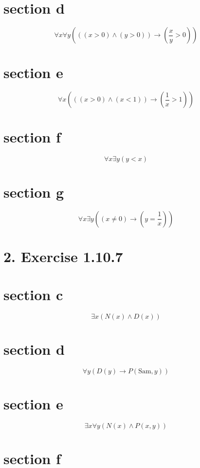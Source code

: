 \documentclass[10pt]{article}
\begin{document}
\section*{section d}

$$
\forall x \forall y\left(((x>0) \wedge(y>0)) \rightarrow\left(\frac{x}{y}>0\right)\right)
$$

\section*{section e}

$$
\forall x\left(((x>0) \wedge(x<1)) \rightarrow\left(\frac{1}{x}>1\right)\right)
$$

\section*{section f}

$$
\forall x \exists y(y<x)
$$

\section*{section g}

$$
\forall x \exists y\left((x \neq 0) \rightarrow\left(y=\frac{1}{x}\right)\right)
$$

\section*{2. Exercise 1.10.7}
\section*{section c}
$$
\exists x(N(x) \wedge D(x))
$$

\section*{section d}

$$
\forall y(D(y) \rightarrow P(\mathrm{Sam}, y))
$$

\section*{section e}

$$
\exists x \forall y(N(x) \wedge P(x, y))
$$

\section*{section f}
\end{document}
